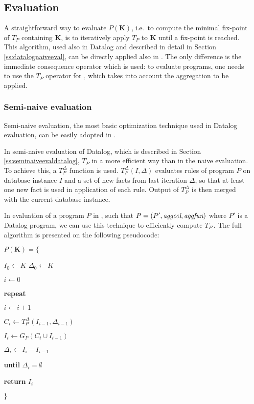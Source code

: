 \subsection{Evaluation}
A straightforward way to evaluate $P(\textbf{K})$, i.e.\ to compute the minimal fix-point of $T_P$ containing $\textbf{K}$, is to iteratively apply $T_P$ to $\textbf{K}$ until a fix-point is reached. This algorithm, used also in Datalog and described in detail in Section \ref{ss:datalognaiveeval}, can be directly applied also in \datalogra. The only difference is the immediate consequence operator which is used: to evaluate \datalogra programs, one needs to use the $T_P$ operator for \datalogra, which takes into account the aggregation to be applied.

\subsubsection{Semi-naive evaluation} Semi-naive evaluation, the most basic optimization technique used in Datalog evaluation, can be easily adopted in \datalogra.

In semi-naive evaluation of Datalog, which is described in Section \ref{ss:seminaiveevaldatalog}, $T_P$ in a more efficient way than in the naive evaluation. To achieve this, a $T^\Delta_P$ function is used. $T_P^\Delta(I, \Delta)$ evaluates rules of program $P$ on database instance $I$ and a set of new facts from last iteration $\Delta$, so that at least one new fact is used in application of each rule. Output of $T^\Delta_P$ is then merged with the current database instance.

In evaluation of a program $P$ in \datalogra, such that $P = (P', \textit{aggcol}, \textit{aggfun})$ where $P'$ is a Datalog program, we can use this technique to efficiently compute $T_{P'}$. The full algorithm is presented on the following pseudocode:


\parbox{0.5\textwidth}{
$P(\textbf{K}) = \{$

{\addtolength{\leftskip}{5mm}

$I_0 \leftarrow K$
$\Delta_0 \leftarrow K$

$i \leftarrow 0$

\textbf{repeat}

{\addtolength{\leftskip}{5mm}

$i \leftarrow i + 1$

$C_i \leftarrow T_P^\Delta(I_{i-1}, \Delta_{i-1})$

$I_i \leftarrow G_P(C_i \cup I_{i-1})$

$\Delta_i \leftarrow I_i - I_{i-1}$

}

\textbf{until} $\Delta_i = \emptyset$

\textbf{return} $I_i$

}

$\}$
}


